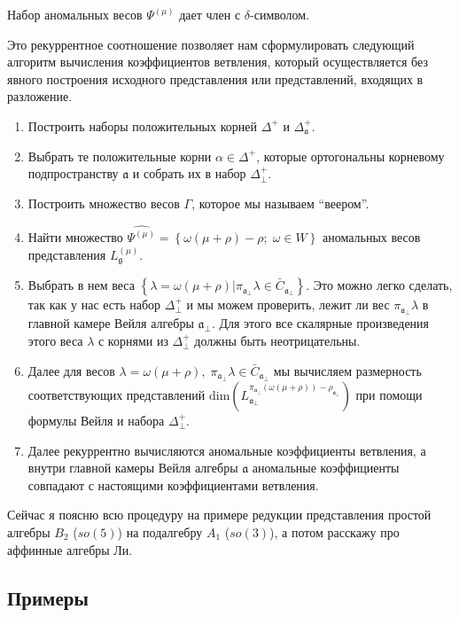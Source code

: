 \documentclass[a4paper,12pt]{article}
\theoremstyle{definition} \newtheorem{Def}{Definition}
\begin{document}
Набор аномальных весов $\Psi^{(\mu)}$ дает член с $\delta$-символом.

Это рекуррентное соотношение позволяет нам сформулировать следующий алгоритм вычисления
коэффициентов ветвления, который осуществляется без явного построения исходного представления или
представлений, входящих в разложение.
\begin{enumerate}
\item Построить наборы положительных корней $\Delta^{+}$ и $\Delta_{\mathfrak{a}}^{+}$.
\item Выбрать те положительные корни $\alpha\in \Delta^{+}$, которые ортогональны корневому
  подпространству  $\mathfrak{a}$ и собрать их в набор $\Delta^{+}_{\bot}$.
\item Построить множество весов $\Gamma$, которое мы называем ``веером''.
\item Найти множество $\widehat{\Psi^{(\mu)}}=\left\{\omega(\mu+\rho)-\rho;\; \omega\in W\right\}$
  аномальных весов представления $L^{(\mu)}_{\mathfrak{g}}$.
\item Выбрать в нем веса $\left\{ \lambda=\omega(\mu+\rho) | \pi_{\mathfrak{a}_{\bot}}\lambda \in
    \bar{C}_{\mathfrak{a}_{\bot}} \right\}$. Это можно легко сделать, так как у нас есть набор
  $\Delta^{+}_{\bot}$ и мы можем проверить, лежит ли вес $\pi_{\mathfrak{a}_{\bot}}\lambda$ в
  главной камере Вейля алгебры $\mathfrak{a}_{\bot}$. Для этого все скалярные произведения этого
  веса $\lambda$ с корнями из  $\Delta^{+}_{\bot}$ должны быть неотрицательны.
\item Далее для весов $\lambda=\omega(\mu+\rho),\; \pi_{\mathfrak{a}_{\bot}}\lambda\in
  \bar{C}_{\mathfrak{a}_{\bot}}$ мы вычисляем размерность соответствующих представлений
  $\mathrm{dim}\left(L^{\pi_{\mathfrak{a}_{\bot}}(\omega(\mu+\rho))-\rho_{\mathfrak{a}_{\bot}}}_{\mathfrak{a}_{\bot}}\right)$
  при помощи формулы Вейля и набора $\Delta^{+}_{\bot}$.
\item Далее рекуррентно вычисляются аномальные коэффициенты ветвления, а внутри главной камеры Вейля
  алгебры $\mathfrak{a}$ аномальные коэффициенты совпадают с настоящими коэффициентами ветвления.
\end{enumerate}

Сейчас я поясню всю процедуру на примере редукции представления простой алгебры $B_2$ ($so(5)$) на
подалгебру $A_1$ ($so(3)$), а потом расскажу про аффинные алгебры Ли.

\subsection{Примеры}
\label{sec:examples}
\end{document}
